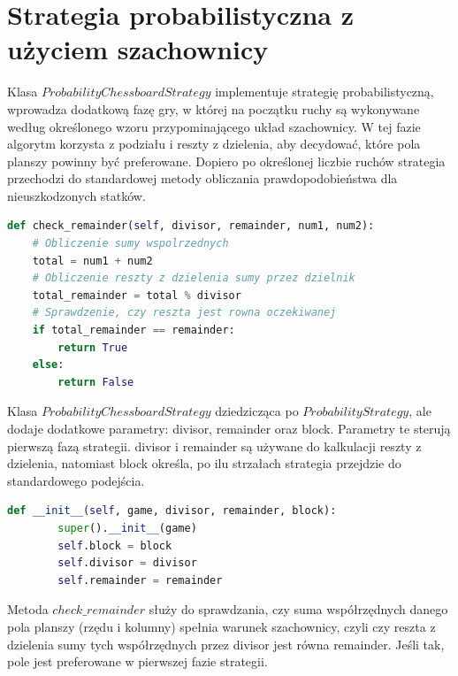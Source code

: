 \documentclass[magisterska]{pracadypl}
\begin{document}
\section{Strategia probabilistyczna z użyciem szachownicy}
Klasa $ProbabilityChessboardStrategy$ implementuje strategię probabilistyczną, wprowadza dodatkową fazę gry, w której na początku ruchy są wykonywane według określonego wzoru przypominającego układ szachownicy. W tej fazie algorytm korzysta z podziału i reszty z dzielenia, aby decydować, które pola planszy powinny być preferowane. Dopiero po określonej liczbie ruchów strategia przechodzi do standardowej metody obliczania prawdopodobieństwa dla nieuszkodzonych statków.
\begin{lstlisting}[language=Python,caption = Metoda sprawdzajajaca reszte z dzielenia z klasy ProbabilityChessboardStrategy]
def check_remainder(self, divisor, remainder, num1, num2):
    # Obliczenie sumy wspolrzednych
    total = num1 + num2
    # Obliczenie reszty z dzielenia sumy przez dzielnik
    total_remainder = total % divisor
    # Sprawdzenie, czy reszta jest rowna oczekiwanej
    if total_remainder == remainder:
        return True
    else:
        return False
\end{lstlisting}
Klasa $ProbabilityChessboardStrategy$ dziedzicząca po $ProbabilityStrategy$, ale dodaje dodatkowe parametry: divisor, remainder oraz block. Parametry te sterują pierwszą fazą strategii.
divisor i remainder są używane do kalkulacji reszty z dzielenia, natomiast block określa, po ilu strzałach strategia przejdzie do standardowego podejścia.
\begin{lstlisting}[language=Python,caption= Kod Konstruktora dla klasy ProbabilityChessboardStrategy]
    def __init__(self, game, divisor, remainder, block):
        super().__init__(game)
        self.block = block
        self.divisor = divisor
        self.remainder = remainder
\end{lstlisting}
Metoda $check\_remainder$ służy do sprawdzania, czy suma współrzędnych danego pola planszy (rzędu i kolumny) spełnia warunek szachownicy, czyli czy reszta z dzielenia sumy tych współrzędnych przez divisor jest równa remainder. Jeśli tak, pole jest preferowane w pierwszej fazie strategii.
\end{document}
